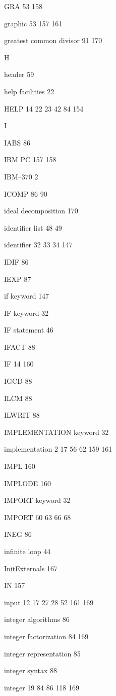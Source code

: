 \item GRA  53 158
\item graphic  53  157 161
\item greatest common divisor  91 170
\indexspace
\item {\Large H}
\item header 59
\item help facilities 22
\item HELP  14 22 23 42 84 154
\indexspace
\item {\Large I}
\item IABS 86
\item IBM PC  157 158
\item IBM--370 2
\item ICOMP  86 90
\item ideal decomposition 170
\item identifier list  48 49
\item identifier  32 33 34  147
\item IDIF 86
\item IEXP 87
\item if keyword 147
\item IF keyword 32
\item IF statement 46
\item IFACT 88
\item IF  14 160
\item IGCD 88
\item ILCM 88
\item ILWRIT 88
\item IMPLEMENTATION keyword 32
\item implementation  2 17 56 62  159 161
\item IMPL 160
\item IMPLODE 160
\item IMPORT keyword 32
\item IMPORT  60 63 66 68
\item INEG 86
\item infinite loop 44
\item InitExternals 167
\item IN 157
\item input  12 17 27 28 52 161 169
\item integer algorithms 86
\item integer factorization  84  169
\item integer representation 85
\item integer syntax 88
\item integer  19 84 86  118 169
